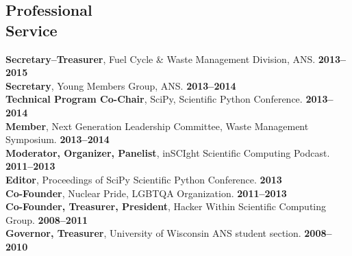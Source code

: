 \documentclass[margin,line]{resume}
\begin{document}
\begin{resume}
    \section{\mysidestyle Professional\\Service}
		\textbf{Secretary--Treasurer}, Fuel Cycle \& Waste Management Division, ANS. \hfill \textbf{2013--2015}\vspace{.5mm}\\%
		\textbf{Secretary}, Young Members Group, ANS. \hfill \textbf{2013--2014}\vspace{.5mm}\\%
		\textbf{Technical Program Co-Chair}, SciPy, Scientific Python Conference.  \hfill \textbf{2013--2014}\vspace{.5mm}\\%
		\textbf{Member}, Next Generation Leadership Committee, Waste Management Symposium. \hfill \textbf{2013--2014}\vspace{.5mm}\\%
		\textbf{Moderator, Organizer, Panelist}, inSCIght Scientific Computing Podcast. \hfill \textbf{2011--2013}\vspace{.5mm}\\%
		\textbf{Editor}, Proceedings of SciPy Scientific Python Conference.  \hfill \textbf{2013}\vspace{.5mm}\\%
		\textbf{Co-Founder}, Nuclear Pride, LGBTQA Organization. \hfill \textbf{2011--2013}\vspace{.5mm}\\%
		\textbf{Co-Founder, Treasurer, President}, Hacker Within Scientific Computing Group. \hfill \textbf{2008--2011}\vspace{.5mm}\\%
		\textbf{Governor, Treasurer}, University of Wisconsin ANS student section. \hfill \textbf{2008--2010}\vspace{.5mm}\\%

%   
%  
%  
%  
%  
%  
%  
\end{resume}
\end{document}
